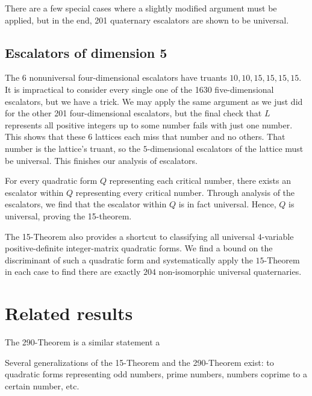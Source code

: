 \documentclass[letterpaper, 12pt]{article}
\begin{document}
There are a few special cases where a slightly modified argument must be applied, but in the end, 201 quaternary escalators are shown to be universal.

\subsection{Escalators of dimension 5}
The $6$ nonuniversal four-dimensional escalators have truants $10,10,15,15,15,15$. It is impractical to consider every single one of the 1630 five-dimensional escalators, but we have a trick. We may apply the same argument as we just did for the other 201 four-dimensional escalators, but the final check that $L$ represents all positive integers up to some number fails with just one number. This shows that these $6$ lattices each miss that number and no others. That number is the lattice's truant, so the $5$-dimensional escalators of the lattice must be universal. This finishes our analysis of escalators.

For every quadratic form $Q$ representing each critical number, there exists an escalator within $Q$ representing every critical number. Through analysis of the escalators, we find that the escalator within $Q$ is in fact universal. Hence, $Q$ is universal, proving the 15-theorem.

The 15-Theorem also provides a shortcut to classifying all universal $4$-variable positive-definite integer-matrix quadratic forms. We find a bound on the discriminant of such a quadratic form and systematically apply the $15$-Theorem in each case to find there are exactly $204$ non-isomorphic universal quaternaries.

\section{Related results}
The 290-Theorem is a similar statement a

Several generalizations of the 15-Theorem and the 290-Theorem exist: to quadratic forms representing odd numbers, prime numbers, numbers coprime to a certain number, etc.
\end{document}
